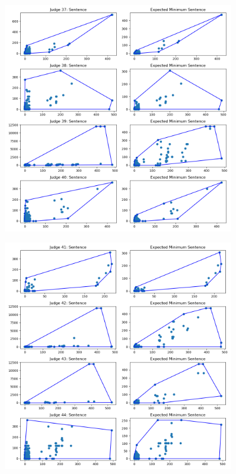 \documentclass[11pt]{article}
\begin{document}
  \begin{figure}[H]
    \centering
    \includegraphics[width=0.9\textwidth]{../../../output/figures/Exploration/judge_convex_hulls_9.png}
  \end{figure}

  \begin{figure}[H]
    \centering
    \includegraphics[width=0.9\textwidth]{../../../output/figures/Exploration/judge_convex_hulls_10.png}
  \end{figure}
\end{document}
